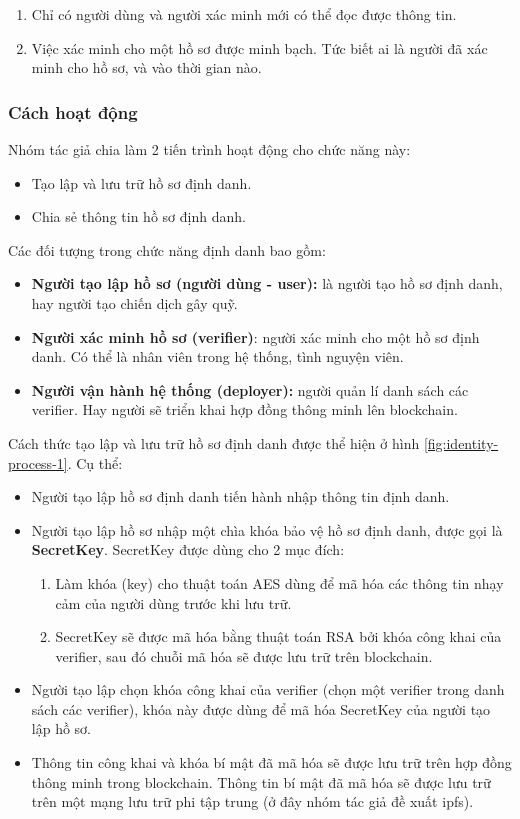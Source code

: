 \documentclass[../main-report.tex]{subfiles}
\begin{document}
\begin{enumerate}
\item Chỉ có người dùng và người xác minh mới có thể đọc được thông tin.
\item Việc xác minh cho một hồ sơ được minh bạch. Tức biết ai là người đã xác minh cho hồ sơ, và vào thời gian nào.
\end{enumerate}

\subsubsection{Cách hoạt động}
Nhóm tác giả chia làm 2 tiến trình hoạt động cho chức năng này:

\begin{itemize}
\item Tạo lập và lưu trữ hồ sơ định danh.
\item Chia sẻ thông tin hồ sơ định danh.
\end{itemize}

Các đối tượng trong chức năng định danh bao gồm:

\begin{itemize}
\item \textbf{Người tạo lập hồ sơ (người dùng - user):} là người tạo hồ sơ định danh, hay người tạo chiến dịch gây quỹ.
\item \textbf{Người xác minh hồ sơ (verifier)}: người xác minh cho một hồ sơ định danh. Có thể là nhân viên trong hệ thống, tình nguyện viên.
\item \textbf{Người vận hành hệ thống (deployer):} người quản lí danh sách các verifier. Hay người sẽ triển khai hợp đồng thông minh lên \gls{blockchain}.
\end{itemize}

Cách thức tạo lập và lưu trữ hồ sơ định danh được thể hiện ở hình \ref{fig:identity-process-1}. Cụ thể:

\begin{itemize}
\item Người tạo lập hồ sơ định danh tiến hành nhập thông tin định danh.
\item Người tạo lập hồ sơ nhập một chìa khóa bảo vệ hồ sơ định danh, được gọi là \textbf{SecretKey}. SecretKey được dùng cho 2 mục đích:
\begin{enumerate}[label=(\roman*)]
\item Làm khóa (key) cho thuật toán AES dùng để mã hóa các thông tin nhạy cảm của người dùng trước khi lưu trữ.
\item SecretKey sẽ được mã hóa bằng thuật toán RSA bởi khóa công khai của verifier, sau đó chuỗi mã hóa sẽ được lưu trữ trên \gls{blockchain}.
\end{enumerate}
\item Người tạo lập chọn khóa công khai của verifier (chọn một verifier trong danh sách các verifier), khóa này được dùng để mã hóa SecretKey của người tạo lập hồ sơ.
\item Thông tin công khai và khóa bí mật đã mã hóa sẽ được lưu trữ trên hợp đồng thông minh trong blockchain. Thông tin bí mật đã mã hóa sẽ được lưu trữ trên một mạng lưu trữ phi tập trung (ở đây nhóm tác giả đề xuất \acrshort{ipfs}).
\end{itemize}
\end{document}
